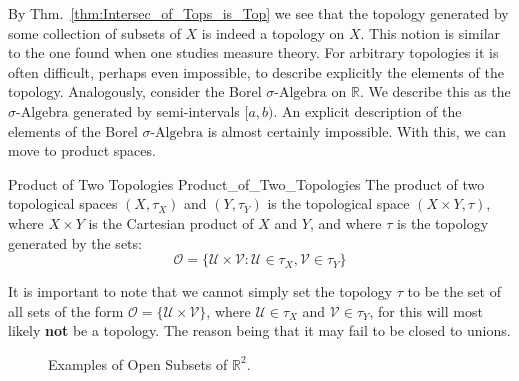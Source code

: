     By Thm.~\ref{thm:Intersec_of_Tops_is_Top} we see
    that the topology generated by some collection of subsets of
    $X$ is indeed a topology on $X$. This notion is similar to
    the one found when one studies measure theory. For
    arbitrary topologies it is often difficult, perhaps
    even impossible, to describe explicitly the elements of the
    topology. Analogously, consider the Borel
    $\sigma\textrm{-Algebra}$ on $\mathbb{R}$. We describe
    this as the $\sigma\textrm{-Algebra}$ generated by
    semi-intervals $[a,b)$. An explicit description of the elements
    of the Borel $\sigma\textrm{-Algebra}$ is almost certainly
    impossible. With this, we can move to product spaces.
    \begin{ldefinition}{Product of Two Topologies}
          {Product_of_Two_Topologies}
        The product of two topological spaces $(X,\tau_{X})$ and
        $(Y,\tau_{Y})$ is the topological space $(X\times{Y},\tau)$,
        where $X\times{Y}$ is the Cartesian product of $X$ and $Y$,
        and where $\tau$ is the topology generated by the sets:
        \begin{equation}
            \mathcal{O}=\big\{\mathcal{U}\times\mathcal{V}:
                \mathcal{U}\in\tau_{X},\mathcal{V}\in\tau_{Y}\big\}
        \end{equation}
    \end{ldefinition}
    It is important to note that we cannot simply set the topology
    $\tau$ to be the set of all sets of the form
    $\mathcal{O}=\big\{\mathcal{U}\times\mathcal{V}\big\}$, where
    $\mathcal{U}\in\tau_{X}$ and $\mathcal{V}\in\tau_{Y}$, for
    this will most likely \textbf{not} be a topology.
    The reason being that it may fail to be closed to unions.
    \begin{figure}[H]
        \centering
        \captionsetup{type=figure}
        \begin{subfigure}[b]{0.49\textwidth}
            \centering
            
        \end{subfigure}
        \begin{subfigure}[b]{0.49\textwidth}
            \centering
        \end{subfigure}
        \caption{Examples of Open Subsets of $\mathbb{R}^{2}$.}
        \label{fig:Point_Set_Top_Open_Subsets_R2}
    \end{figure}
